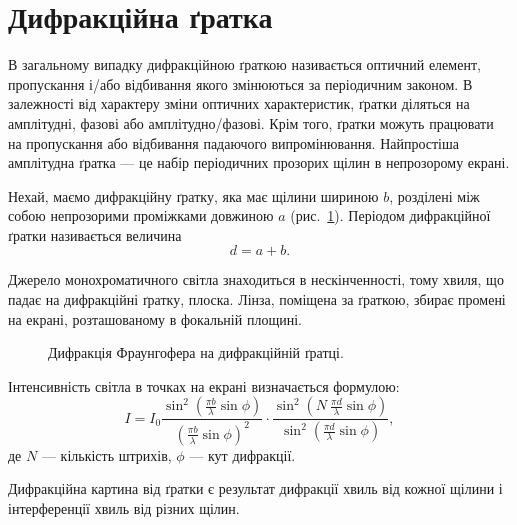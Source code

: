 





\section{Дифракційна ґратка}

В загальному випадку дифракційною ґраткою називається оптичний елемент, пропускання і/або відбивання якого змінюються за періодичним законом. В залежності від характеру зміни оптичних характеристик, ґратки діляться на амплітудні, фазові або амплітудно/фазові. Крім того, ґратки можуть працювати на пропускання або відбивання падаючого випромінювання. Найпростіша амплітудна ґратка --- це набір періодичних прозорих щілин в непрозорому екрані.

Нехай, маємо дифракційну ґратку, яка має щілини шириною $b$, розділені між собою непрозорими проміжками довжиною $a$ (рис.~\ref{pic:slots}). Періодом дифракційної ґратки називається величина
\begin{equation*}
    d = a + b.
\end{equation*}


Джерело монохроматичного світла знаходиться в нескінченності, тому хвиля, що падає на дифракційні ґратку, плоска. Лінза, поміщена за ґраткою, збирає промені на екрані, розташованому в фокальній площині.

\begin{figure}[hb!]\centering
    
    \caption{Дифракція Фраунгофера на дифракційній ґратці.}
    \label{pic:slots}
\end{figure}


Інтенсивність світла в точках на екрані визначається формулою:
\begin{equation}\label{eq:Difraction_I_slots}
    I = I_0 \frac{\sin^2\left( {\frac{\pi b}{\lambda} \sin\phi}\right)}{\left( \frac{\pi b}{\lambda} \sin\phi\right)^2} \cdot
    \frac{\sin^2\left( {N\ \frac{\pi d}{\lambda} \sin\phi}\right)}{\sin^2\left( \frac{\pi d}{\lambda} \sin\phi\right)},
\end{equation}
де $N$ --- кількість штрихів, $\phi$ --- кут дифракції.

Дифракційна картина від ґратки є результат дифракції хвиль від кожної щілини і інтерференції хвиль від різних щілин.

